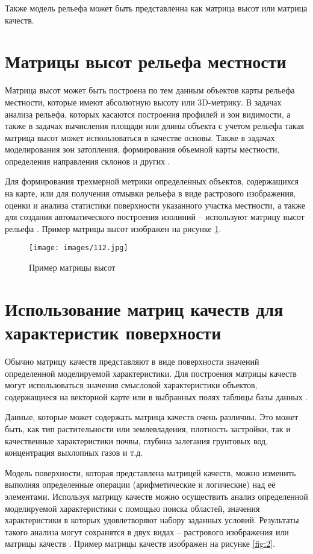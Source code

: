 Также модель рельефа может быть представленна как матрица высот или матрица качеств.
\section{Матрицы высот рельефа местности}

Матрица высот может быть построена по тем данным объектов карты рельефа местности, которые имеют абсолютную высоту или 3D-метрику. В задачах анализа рельефа, которых касаются построения профилей и зон видимости, а также в задачах вычисления площади или длины объекта с учетом рельефа такая матрица высот может использоваться в качестве основы. Также в задачах моделирования зон затопления, формирования объемной карты местности, определения направления склонов и других \cite{4,12}.

Для формирования трехмерной метрики определенных объектов, содержащихся на карте, или для получения отмывки рельефа в виде растрового изображения, оценки и анализа статистики поверхности указанного участка местности, а также для создания автоматического построения изолиний -- используют матрицу высот рельефа \cite{5,14}. Пример матрицы высот изображен на рисунке   \ref{fig:1}.
\begin{figure}[h!]
    \center
    \texttt{[image: images/112.jpg]}
    \caption{Пример матрицы высот}
    \label{fig:1}
\end{figure}

\section{Использование матриц качеств для характеристик поверхности}

Обычно матрицу качеств представляют в виде поверхности значений определенной моделируемой характеристики. Для построения матрицы качеств могут использоваться значения смысловой характеристики объектов, содержащиеся на векторной карте или в выбранных полях таблицы базы данных \cite{6, 7}. 

Данные, которые может содержать матрица качеств очень различны. Это может быть, как тип растительности или землевладения, плотность застройки, так и качественные характеристики почвы, глубина залегания грунтовых вод, концентрация выхлопных газов и т.д.

Модель поверхности, которая представлена матрицей качеств, можно изменить выполняя определенные операции (арифметические и логические) над её элементами. Используя матрицу качеств можно осуществить анализ определенной моделируемой характеристики с помощью поиска областей, значения характеристики в которых удовлетворяют набору заданных условий. Результаты такого анализа могут сохранятся в двух видах -- растрового изображения или матрицы качеств \cite{8,16}. Пример матрицы качеств изображен на рисунке \ref{fig:2}.

